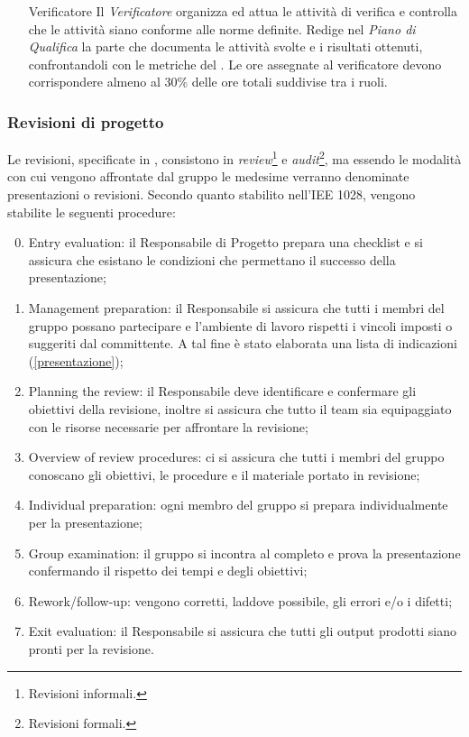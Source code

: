 \begin{itemize}
\begin{itemize}
  \end{itemize}

\item[Verificatore] Il \textit{Verificatore} organizza ed attua le attivit\`a di verifica e controlla che le attivit\`a siano conforme alle norme definite. Redige nel \textit{Piano di Qualifica} la parte che documenta le attivit\`a svolte e i risultati ottenuti, confrontandoli con le metriche del \PianoDiQualifica. Le ore assegnate al verificatore devono corrispondere almeno al 30\% delle ore totali suddivise tra i ruoli.
  
\end{itemize}

\subsubsection{Revisioni di progetto}

Le revisioni, specificate in \PianoDiProgetto, consistono in \textit{review}\footnote{Revisioni informali.} e \textit{audit}\footnote{Revisioni formali.}, ma essendo le modalit\`a con cui vengono affrontate dal gruppo le medesime verranno denominate presentazioni o revisioni. Secondo quanto stabilito nell'IEE 1028, vengono stabilite le seguenti procedure:
\begin{enumerate}
	\setcounter{enumi}{-1}
	\item Entry evaluation: il Responsabile di Progetto prepara una checklist e si assicura che esistano le condizioni che permettano il successo della presentazione;
	\item Management preparation: il Responsabile si assicura che tutti i membri del gruppo possano partecipare e l'ambiente di lavoro rispetti i vincoli imposti o suggeriti dal committente. A tal fine è stato elaborata una lista di indicazioni (\ref{presentazione});
	\item Planning the review: il Responsabile deve identificare e confermare gli obiettivi della revisione, inoltre si assicura che tutto il team sia equipaggiato con le risorse necessarie per affrontare la revisione;
	\item Overview of review procedures: ci si assicura che tutti i membri del gruppo conoscano gli obiettivi, le procedure e il materiale portato in revisione;
	\item Individual preparation: ogni membro del gruppo si prepara individualmente per la presentazione;
	\item Group examination: il gruppo si incontra al completo e prova la presentazione confermando il rispetto dei tempi e degli obiettivi;
	\item Rework/follow-up: vengono corretti, laddove possibile,  gli errori e/o i difetti;
	\item Exit evaluation: il Responsabile si assicura che tutti gli output prodotti siano pronti per la revisione.
\end{enumerate}

